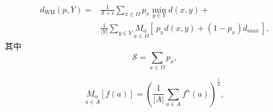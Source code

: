 \documentclass[10pt,twocolumn,letterpaper,UTF8]{article}
\begin{document}
\begin{equation}
  \label{eq:WH}
    \begin{split}
        d_{\text{WH}}(p, Y) = &\frac{1}{\mathcal{S}+ \epsilon} \sum_{x\in \Omega} p_x \min_{y\in Y} d(x, y) + \\
        & \frac{1}{|Y|} \sum_{y\in Y} \underset{x\in \Omega}{M_\alpha} \left[\> p_x d(x, y) + (1 - p_x) d_{max} \, \right],
    \end{split}
\end{equation}
其中
\begin{equation}
  \label{eq:denom}
    \mathcal{S} = \sum_{x\in \Omega} p_x ,
\end{equation}

\begin{equation}
  \label{eq:genmean}
      \underset{a\in A}{M_\alpha} \left[ f(a) \right] = \left( \frac{1}{|A|} \sum_{a\in A} f^\alpha(a) \right) ^\frac{1}{\alpha} ,
\end{equation}
\end{document}
